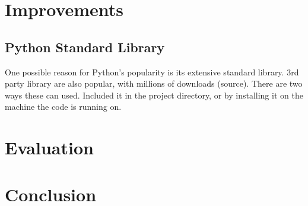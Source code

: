 \documentclass[12pt, titlepage]{article}
\begin{document}
\newpage
\section{Improvements}

\subsection{Python Standard Library}
One possible reason for Python's popularity is its extensive standard library. 3rd party library are also popular, with millions of downloads (source). There are two ways these can used. Included it in the project directory, or by installing it on the machine the code is running on.

\newpage
\section{Evaluation}


\newpage
\section{Conclusion}


\newpage
{}

\end{document}
